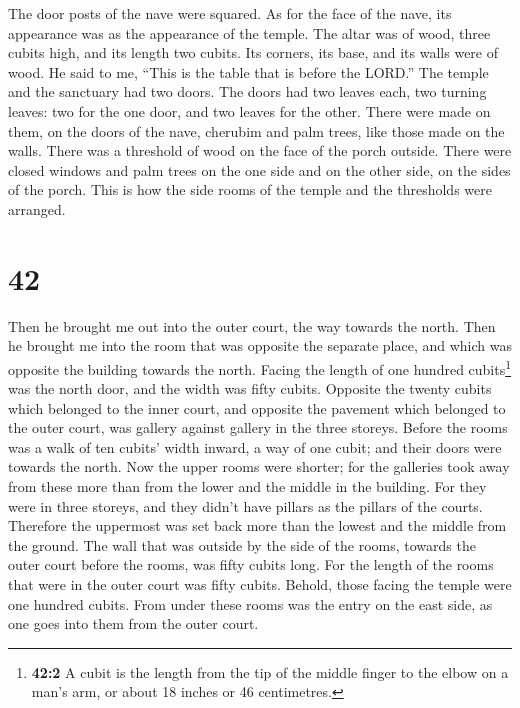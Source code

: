  The door posts of the nave were squared. As for the face
of the nave, its appearance was as the appearance of the temple.
 The altar was of wood, three cubits high, and its length
two cubits. Its corners, its base, and its walls were of wood. He said
to me, ``This is the table that is before the LORD.'' 
The temple and the sanctuary had two doors.  The doors
had two leaves each, two turning leaves: two for the one door, and two
leaves for the other.  There were made on them, on the
doors of the nave, cherubim and palm trees, like those made on the
walls. There was a threshold of wood on the face of the porch outside.
 There were closed windows and palm trees on the one side
and on the other side, on the sides of the porch. This is how the side
rooms of the temple and the thresholds were arranged.

\hypertarget{section-40}{%
\section{42}\label{section-40}}

 Then he brought me out into the outer court, the way
towards the north. Then he brought me into the room that was opposite
the separate place, and which was opposite the building towards the
north.  Facing the length of one hundred cubits\footnote{\textbf{42:2}
  A cubit is the length from the tip of the middle finger to the elbow
  on a man's arm, or about 18 inches or 46 centimetres.} was the north
door, and the width was fifty cubits.  Opposite the twenty
cubits which belonged to the inner court, and opposite the pavement
which belonged to the outer court, was gallery against gallery in the
three storeys.  Before the rooms was a walk of ten cubits'
width inward, a way of one cubit; and their doors were towards the
north.  Now the upper rooms were shorter; for the
galleries took away from these more than from the lower and the middle
in the building.  For they were in three storeys, and they
didn't have pillars as the pillars of the courts. Therefore the
uppermost was set back more than the lowest and the middle from the
ground.  The wall that was outside by the side of the
rooms, towards the outer court before the rooms, was fifty cubits long.
 For the length of the rooms that were in the outer court
was fifty cubits. Behold, those facing the temple were one hundred
cubits.  From under these rooms was the entry on the east
side, as one goes into them from the outer court.

